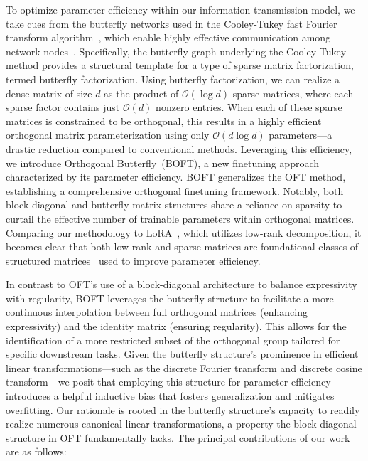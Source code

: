 To optimize parameter efficiency within our information transmission model, we take cues from the butterfly networks used in the Cooley-Tukey fast Fourier transform algorithm~\cite{cooley1965algorithm}, which enable highly effective communication among network nodes~\cite{klasing1994broadcasting}. Specifically, the butterfly graph underlying the Cooley-Tukey method provides a structural template for a type of sparse matrix factorization, termed butterfly factorization. Using butterfly factorization, we can realize a dense matrix of size $d$ as the product of $\mathcal{O}(\log d)$ sparse matrices, where each sparse factor contains just $\mathcal{O}(d)$ nonzero entries. When each of these sparse matrices is constrained to be orthogonal, this results in a highly efficient orthogonal matrix parameterization using only $\mathcal{O}(d\log d)$ parameters—a drastic reduction compared to conventional methods. Leveraging this efficiency, we introduce Orthogonal Butterfly~(BOFT), a new finetuning approach characterized by its parameter efficiency. BOFT generalizes the OFT method, establishing a comprehensive orthogonal finetuning framework. Notably, both block-diagonal and butterfly matrix structures share a reliance on sparsity to curtail the effective number of trainable parameters within orthogonal matrices. Comparing our methodology to LoRA~\cite{hulora2022}, which utilizes low-rank decomposition, it becomes clear that both low-rank and sparse matrices are foundational classes of structured matrices~\cite{candes2011robust} used to improve parameter efficiency.

In contrast to OFT's use of a block-diagonal architecture to balance expressivity with regularity, BOFT leverages the butterfly structure to facilitate a more continuous interpolation between full orthogonal matrices (enhancing expressivity) and the identity matrix (ensuring regularity). This allows for the identification of a more restricted subset of the orthogonal group tailored for specific downstream tasks. Given the butterfly structure's prominence in efficient linear transformations—such as the discrete Fourier transform and discrete cosine transform—we posit that employing this structure for parameter efficiency introduces a helpful inductive bias that fosters generalization and mitigates overfitting. Our rationale is rooted in the butterfly structure's capacity to readily realize numerous canonical linear transformations, a property the block-diagonal structure in OFT fundamentally lacks. The principal contributions of our work are as follows:

